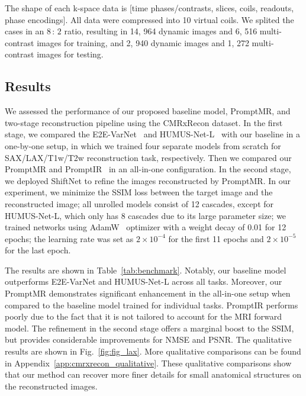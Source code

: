 \documentclass[runningheads]{llncs}
\begin{document}
The shape of each k-space data is [time phases/contrasts, slices, coils, readouts, phase encodings]. 
All data were compressed into 10 virtual coils. We splited the cases in an $8\, :\, 2$ ratio, resulting in 14, 964 dynamic images and 6, 516 multi-contrast images for training, and 2, 940 dynamic images and 1, 272 multi-contrast images for testing.

\subsection{Results}
We assessed the performance of our proposed baseline model, PromptMR, and two-stage reconstruction pipeline using the CMRxRecon dataset. In the first stage, we compared the E2E-VarNet~\cite{sriram2020end} and HUMUS-Net-L~\cite{fabian2022humus} with our baseline in a one-by-one setup, in which we trained four separate models from scratch for SAX/LAX/T1w/T2w reconstruction task, respectively. Then we compared our PromptMR and PromptIR~\cite{potlapalli2023promptir} in an all-in-one configuration. 
In the second stage, we deployed ShiftNet to refine the images reconstructed by PromptMR. In our experiment,  we minimize the SSIM loss between the target image and the reconstructed image; all unrolled models consist of 12 cascades, except for HUMUS-Net-L, which only has 8 cascades due to its large parameter size; we trained networks using AdamW~\cite{loshchilov2017decoupled} optimizer with a weight decay of 0.01 for 12 epochs; the learning rate was set as $2\times 10^{-4}$ for the first 11 epochs and $2\times 10^{-5}$ for the last epoch. 

The results are shown in Table~\ref{tab:benchmark}. Notably, our baseline model outperforms E2E-VarNet and HUMUS-Net-L across all tasks. Moreover, our PromptMR demonstrates significant enhancement in the all-in-one setup when compared to the baseline model trained for individual tasks. PromptIR performs poorly due to the fact that it is not tailored to account for the MRI forward model. The refinement in the second stage offers a marginal boost to the SSIM, but provides considerable improvements for NMSE and PSNR. The qualitative results are shown in Fig.~\ref{fig:fig_lax}. More qualitative comparisons can be found in Appendix~\ref{app:cmrxrecon_qualitative}. 
These qualitative comparisons show that our method can recover more finer details for small anatomical structures on the reconstructed images.
\end{document}
